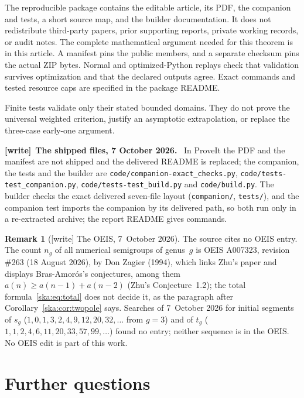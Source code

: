 \documentclass[11pt,letterpaper]{article}
\theoremstyle{definition}
\newtheorem{remark}[theorem]{Remark}
\newcommand{\file}[1]{\nolinkurl{#1}}
\newenvironment{writenote}[1][]{\par\smallskip\begingroup\small
 \noindent\textbf{[write]}\if\relax\detokenize{#1}\relax\else~\textbf{#1.}\fi\ }%
 {\par\endgroup\smallskip}
\begin{document}
The reproducible package contains the editable article, its PDF, the companion and tests, a short source map, and the builder documentation. It does not redistribute third-party papers, prior supporting reports, private working records, or audit notes. The complete mathematical argument needed for this theorem is in this article. A manifest pins the public members, and a separate checksum pins the actual ZIP bytes. Normal and optimized-Python replays check that validation survives optimization and that the declared outputs agree. Exact commands and tested resource caps are specified in the package README.

Finite tests validate only their stated bounded domains. They do not prove the universal weighted criterion, justify an asymptotic extrapolation, or replace the three-case early-one argument.
\begin{writenote}[The shipped files, 7 October 2026]
In ProveIt the PDF and the manifest are not shipped and the delivered README
is replaced; the companion, the tests and the builder are
\file{code/companion-exact_checks.py}, \file{code/tests-test_companion.py},
\file{code/tests-test_build.py} and \file{code/build.py}. The builder checks
the exact delivered seven-file layout (\file{companion/}, \file{tests/}), and
the companion test imports the companion by its delivered path, so both run
only in a re-extracted archive; the report README gives commands.
\end{writenote}

\begin{remark}[{[write]} The OEIS, 7~October 2026]\label{ska:rem:oeis}
The source cites no OEIS entry. The count $n_g$ of all numerical semigroups of
genus~$g$ is OEIS A007323, revision \#263 (18 August 2026), by Don Zagier
(1994), which links Zhu's paper and displays Bras-Amor\'os's conjectures,
among them $a(n)\ge a(n-1)+a(n-2)$ (Zhu's Conjecture~1.2); the total
formula~\eqref{ska:eq:total} does not decide it, as the paragraph after
Corollary~\ref{ska:cor:twopole} says. Searches of 7~October 2026 for initial
segments of $s_g$ ($1,0,1,3,2,4,9,12,20,32,\ldots$ from $g=3$) and of $t_g$
($1,1,2,4,6,11,20,33,57,99,\ldots$) found no entry; neither sequence is in the
OEIS. No OEIS edit is part of this work.
\end{remark}

\section{Further questions}\label{ska:sec:questions}
\end{document}
